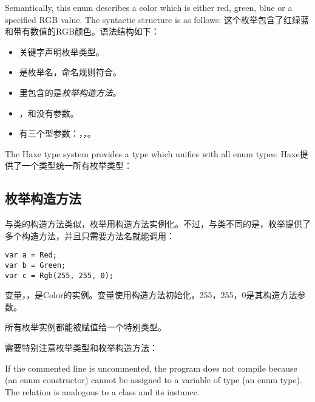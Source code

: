 Semantically, this enum describes a color which is either red, green, blue or a specified RGB value. The syntactic structure is as follows:
这个枚举包含了红绿蓝和带有数值的RGB颜色。语法结构如下：
\begin{itemize}
	\item {}关键字声明枚举类型。
	\item {}是枚举名，命名规则符合。
	\item \expr{$\left\{\right\}$}里包含的是\emph{枚举构造方法}。
	\item {}，和没有参数。 
	\item {}有三个型参数：，，。
\end{itemize}
The Haxe type system provides a type which unifies with all enum types:
Haxe提供了一个类型统一所有枚举类型：


\subsection{枚举构造方法}
\label{types-enum-constructor}

与类的构造方法类似，枚举用构造方法实例化。不过，与类不同的是，枚举提供了多个构造方法，并且只需要方法名就能调用：

\begin{lstlisting}
var a = Red;
var b = Green;
var c = Rgb(255, 255, 0);
\end{lstlisting}
变量，，是Color的实例。变量使用构造方法初始化，255，255，0是其构造方法参数。

所有枚举实例都能被赋值给一个特别类型。


需要特别注意枚举类型和枚举构造方法：


If the commented line is uncommented, the program does not compile because  (an enum constructor) cannot be assigned to a variable of type  (an enum type). The relation is analogous to a class and its instance.


